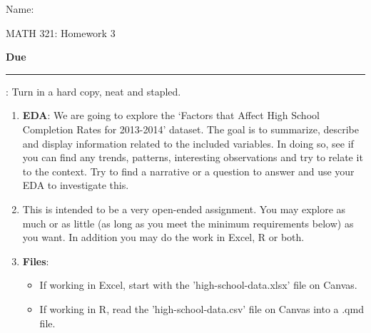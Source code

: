 \documentclass{article}
\newcommand{\blankul}[1]{\rule[-1.5mm]{#1}{0.15mm}}	%
\begin{document}
\hspace{375pt}Name:

\begin{center}
{\Huge MATH 321: Homework 3}
\end{center}

\bigskip\bigskip

{\large \textbf{Due} \blankul{4cm}: Turn in a hard copy, neat and stapled.}\bigskip



\begin{enumerate}
    \item \textbf{EDA}: We are going to explore the `Factors that Affect High School Completion Rates for 2013-2014' dataset. The goal is to summarize, describe and display information related to the included variables. In doing so, see if you can find any trends, patterns, interesting observations and try to relate it to the context. Try to find a narrative or a question to answer and use your EDA to investigate this.
    \item[] This is intended to be a very open-ended assignment. You may explore as much or as little (as long as you meet the minimum requirements below) as you want. In addition you may do the work in Excel, R or both.\bigskip
    \item[] \textbf{Files}:
    \begin{itemize}
        \item If working in Excel, start with the 'high-school-data.xlsx' file on Canvas.
        \item If working in R, read the 'high-school-data.csv' file on Canvas into a .qmd file.
    \end{itemize}\bigskip
    

\end{enumerate}
\end{document}
